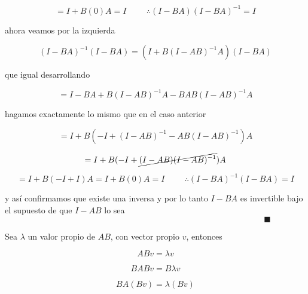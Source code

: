 \documentclass[12pt,a4paper]{article}
\begin{document}
\begin{enumerate}
    \begin{equation*}
        = I + B(0)A = I \hspace{1cm} \therefore (I-BA)(I-BA)^{-1} = I
    \end{equation*}
    
    ahora veamos por la izquierda
    
    \begin{equation*}
        (I-BA)^{-1} (I-BA) = (I + B(I-AB)^{-1} A) (I-BA)
    \end{equation*}
    
    que igual desarrollando
    
    \begin{equation*}
        = I -BA + B(I-AB)^{-1} A -BAB(I-AB)^{-1} A
    \end{equation*}
    
    hagamos exactamente lo mismo que en el caso anterior
    
    \begin{equation*}
        = I+ B(-I + (I-AB)^{-1} -AB(I-AB)^{-1} )A
    \end{equation*}
    
    \begin{equation*}
        = I+ B(-I + \cancel{(I-AB)(I-AB)^{-1}})A
    \end{equation*}
    
    \begin{equation*}
        = I+ B(-I + I)A = I+B(0)A = I \hspace{1cm} \therefore (I-BA)^{-1} (I-BA) = I
    \end{equation*}
    
    y así confirmamos que existe una inversa y por lo tanto $I-BA$ es invertible bajo el supuesto de que $I-AB$ lo sea $\hspace{13cm} \blacksquare$
    
    Sea $\lambda$ un valor propio de $AB$, con vector propio $v$, entonces
    
    \begin{equation*}
        AB v= \lambda v
    \end{equation*}
    
    \begin{equation*}
        BAB v = B \lambda v
    \end{equation*}
    
    \begin{equation*}
        BA(Bv) = \lambda (Bv)
    \end{equation*}
    

\end{enumerate}
\end{document}

